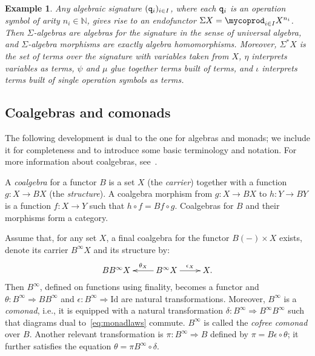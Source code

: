 \documentclass[adraft,copyright,creativecommons]{eptcs}
\newtheorem{example}[theorem]{Example}
\newcommand{\To}{\Longrightarrow}
\newcommand{\Bb}{B^{\infty}}
\newcommand{\Ss}{\Sigma^*}
\renewcommand{\S}{\Sigma}
\newcommand{\Id}{\textrm{Id}}
\begin{document}
\begin{example}\label{ex:syntax}\rm
Any algebraic signature $({\tt q}_i)_{i\in I}$, where each ${\tt q}_i$ is an operation symbol of arity $n_i\in\mathbb{N}$, gives rise to an endofunctor $\Sigma X = \mycoprod_{i\in I}X^{n_i}$. Then $\S$-algebras are algebras for the signature in the sense of universal algebra, and $\S$-algebra morphisms are exactly algebra homomorphisms. Moreover, $\Ss X$ is the set of terms over the signature with variables taken from $X$, $\eta$ interprets variables as terms, $\psi$ and $\mu$ glue together terms built of terms, and $\iota$ interprets terms built of single operation symbols as terms.
\end{example}

\subsection{Coalgebras and comonads}\label{sec:coalgebras}

The following development is dual to the one for algebras and monads; we include it for completeness and to introduce some basic terminology and notation. For more information about coalgebras, see~\cite{ruttentcs}.

A {\em coalgebra} for a functor $B$ is a set $X$ (the {\em carrier}) together with a function $g:X\to BX$ (the {\em structure}). A coalgebra morphism from $g:X\to BX$ to $h:Y \to BY$ is a function $f:X\to Y$ such that $h\circ f = Bf\circ g$. Coalgebras for $B$ and their morphisms form a category.

Assume that, for any set $X$, a final coalgebra for the functor $B(-)\times X$ exists, denote its carrier $\Bb X$ and its structure by:
\[
	\xymatrix{B\Bb X & \Bb X\ar[l]_-{\theta_X}\ar[r]^-{\epsilon_X} & X.}
\]
Then $\Bb$, defined on functions using finality, becomes a functor and $\theta:\Bb\To B\Bb$ and $\epsilon:\Bb\To\Id$ are natural transformations. Moreover, $\Bb$ is a {\em comonad}, i.e., it is equipped with a natural transformation $\delta:\Bb\To\Bb\Bb$ such that diagrams dual to~\eqref{eq:monadlaws} commute.
$\Bb$ is called the {\em cofree comonad} over $B$. Another relevant transformation is $\pi:\Bb\To B$ defined by $\pi = B\epsilon \circ \theta$; it further satisfies the equation $\theta = \pi\Bb\circ\delta$.
\end{document}
